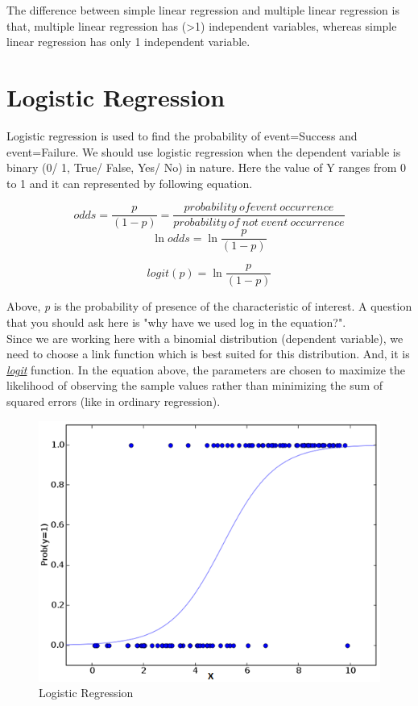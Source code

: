\documentclass[11pt, a4paper]{report}
\begin{document}
The difference between simple linear regression and multiple linear regression is that, multiple linear regression has (\textgreater1) independent variables, whereas simple linear regression has only 1 independent variable. \cite{desc:RegressionAnalysis} 


\section{Logistic Regression}

Logistic regression is used to find the probability of event=Success and event=Failure. We should use logistic regression when the dependent variable is binary (0/ 1, True/ False, Yes/ No) in nature. Here the value of Y ranges from 0 to 1 and it can represented by following equation.


\[ odds = \frac{p}{(1-p)} = \frac{probability \ of event \ occurrence}{probability \ of \ not \ event \ occurrence}
\]
\[ \ln{odds}  = \ln{\frac{p}{(1-p)}} \]


\[ logit (p) = \ln{\frac{p}{(1-p)}} \]

Above, \textit{p} is the probability of presence of the characteristic of interest. A question that you should ask here is "why have we used log in the equation?". \\

Since we are working here with a binomial distribution (dependent variable), we need to choose a link function which is best suited for this distribution. And, it is \href{https://en.wikipedia.org/wiki/Logistic_function}{\textit{logit}} 
function. In the equation above, the parameters are chosen to maximize the likelihood of observing the sample values rather than minimizing the sum of squared errors (like in ordinary regression). \cite{desc:RegressionAnalysis}

\begin{figure}[!bth]
	\center
	\includegraphics[scale=0.5]{images/Logistic_Regression.png}
	\caption[Logistic Regression]{Logistic Regression \cite{desc:RegressionAnalysis}}
	\label{fig:logisticRegression}
\end{figure}
\end{document}
